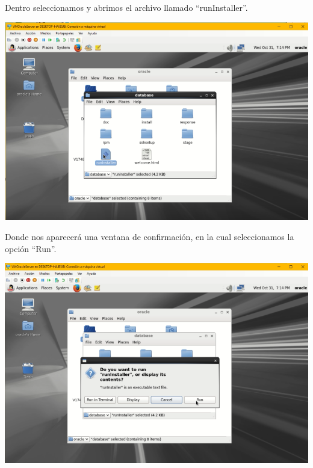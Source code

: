 Dentro seleccionamos y abrimos el archivo llamado “runInstaller”.
\begin{center}
	\includegraphics[width=16cm]{./Imagenes/67} 
\end{center} 

\vspace{\baselineskip}

Donde nos aparecerá una ventana de confirmación, en la cual seleccionamos la opción “Run”.
\begin{center}
	\includegraphics[width=16cm]{./Imagenes/68} 
\end{center} 

\vspace{\baselineskip}

